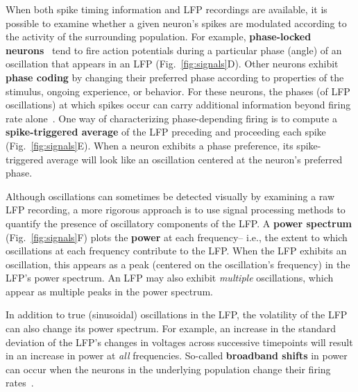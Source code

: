 \documentclass[runningheads]{llncs}
\begin{document}
When both spike timing information and LFP recordings are available,
it is possible to examine whether a given neuron's spikes are
modulated according to the activity of the surrounding population.
For example, \textbf{phase-locked neurons}~\citep{JacoEtal07} tend to
fire action potentials during a particular phase (angle) of an
oscillation that appears in an LFP (Fig.~\ref{fig:signals}D).  Other
neurons exhibit \textbf{phase coding} by changing their preferred
phase according to properties of the stimulus, ongoing experience, or
behavior.  For these neurons, the phases (of LFP oscillations) at
which spikes occur can carry additional information beyond firing rate
alone~\citep{SkagEtal96, HuxtEtal08, KamoEtal98, Lism05}.  One way of
characterizing phase-depending firing is to compute a
\textbf{spike-triggered average} of the LFP preceding and proceeding
each spike (Fig.~\ref{fig:signals}E).  When a neuron exhibits a phase
preference, its spike-triggered average will look like an oscillation
centered at the neuron's preferred phase.

Although oscillations can sometimes be detected visually by examining
a raw LFP recording, a more rigorous approach is to use signal
processing methods to quantify the presence of oscillatory components
of the LFP.  A \textbf{power spectrum} (Fig.~\ref{fig:signals}F) plots
the \textbf{power} at each frequency-- i.e., the extent to which
oscillations at each frequency contribute to the LFP.  When the LFP
exhibits an oscillation, this appears as a peak (centered on the
oscillation's frequency) in the LFP's power spectrum.  An LFP may also
exhibit \textit{multiple} oscillations, which appear as multiple peaks
in the power spectrum.

In addition to true (sinusoidal) oscillations in the LFP, the
volatility of the LFP can also change its power spectrum.  For
example, an increase in the standard deviation of the LFP's changes in
voltages across successive timepoints will result in an increase in
power at \textit{all} frequencies.  So-called \textbf{broadband
  shifts} in power can occur when the neurons in the underlying
population change their firing rates~\citep{MannEtal09a}.
\end{document}

